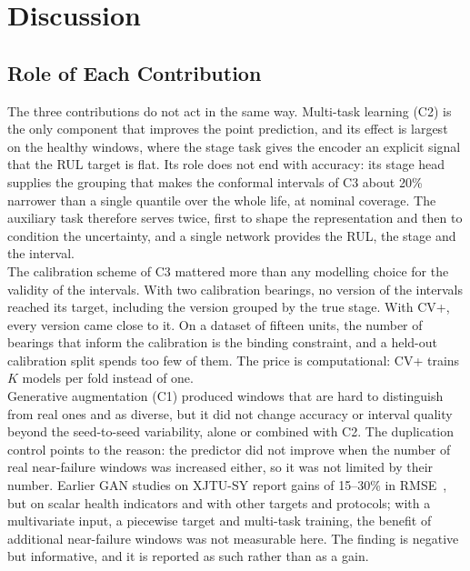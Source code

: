
\section{Discussion}
\label{sec:discussion}

\subsection{Role of Each Contribution}

The three contributions do not act in the same way. Multi-task learning
(C2) is the only component that improves the point prediction, and its
effect is largest on the healthy windows, where the stage task gives
the encoder an explicit signal that the RUL target is flat. Its role
does not end with accuracy: its stage head supplies the grouping that
makes the conformal intervals of C3 about 20\% narrower than a single
quantile over the whole life, at nominal coverage. The auxiliary task
therefore serves twice, first to shape the representation and then to
condition the uncertainty, and a single network provides the RUL, the
stage and the interval.\\

The calibration scheme of C3 mattered more than any modelling choice
for the validity of the intervals. With two calibration bearings, no
version of the intervals reached its target, including the version
grouped by the true stage. With CV+, every version came close to it.
On a dataset of fifteen units, the number of bearings that inform the
calibration is the binding constraint, and a held-out calibration split
spends too few of them. The price is computational: CV+ trains $K$
models per fold instead of one.\\

Generative augmentation (C1) produced windows that are hard to
distinguish from real ones and as diverse, but it did not change
accuracy or interval quality beyond the seed-to-seed variability, alone
or combined with C2. The duplication control points to the reason: the
predictor did not improve when the number of real near-failure windows
was increased either, so it was not limited by their number. Earlier
GAN studies on XJTU-SY report gains of 15--30\% in
RMSE~\cite{9486650, lu_joint_2022}, but on scalar health indicators and
with other targets and protocols; with a multivariate input, a
piecewise target and multi-task training, the benefit of additional
near-failure windows was not measurable here. The finding is negative
but informative, and it is reported as such rather than as a gain.

